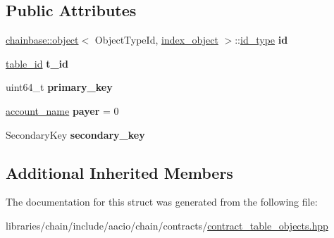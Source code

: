 \subsection*{Public Attributes}
\begin{DoxyCompactItemize}
\item 
\mbox{\label{structaacio_1_1chain_1_1contracts_1_1secondary__index_1_1index__object_a5e4b2e5a34b45ce56045ab8e55d82d5f}} 
\mbox{\hyperlink{structchainbase_1_1object}{chainbase\+::object}}$<$ Object\+Type\+Id, \mbox{\hyperlink{structaacio_1_1chain_1_1contracts_1_1secondary__index_1_1index__object}{index\+\_\+object}} $>$\+::\mbox{\hyperlink{classchainbase_1_1oid}{id\+\_\+type}} {\bfseries id}
\item 
\mbox{\label{structaacio_1_1chain_1_1contracts_1_1secondary__index_1_1index__object_a3207e66e07eeef305b92b35c831e1599}} 
\mbox{\hyperlink{classchainbase_1_1oid}{table\+\_\+id}} {\bfseries t\+\_\+id}
\item 
\mbox{\label{structaacio_1_1chain_1_1contracts_1_1secondary__index_1_1index__object_a916f484dd5f8741087ee1b4558ac43b8}} 
uint64\+\_\+t {\bfseries primary\+\_\+key}
\item 
\mbox{\label{structaacio_1_1chain_1_1contracts_1_1secondary__index_1_1index__object_af9572493db5aaf012c14f9da4833b4d4}} 
\mbox{\hyperlink{structaacio_1_1chain_1_1name}{account\+\_\+name}} {\bfseries payer} = 0
\item 
\mbox{\label{structaacio_1_1chain_1_1contracts_1_1secondary__index_1_1index__object_a6d7c74312cdd21cbae8856afe22627d4}} 
Secondary\+Key {\bfseries secondary\+\_\+key}
\end{DoxyCompactItemize}
\subsection*{Additional Inherited Members}


The documentation for this struct was generated from the following file\+:\begin{DoxyCompactItemize}
\item 
libraries/chain/include/aacio/chain/contracts/\mbox{\hyperlink{contract__table__objects_8hpp}{contract\+\_\+table\+\_\+objects.\+hpp}}\end{DoxyCompactItemize}
